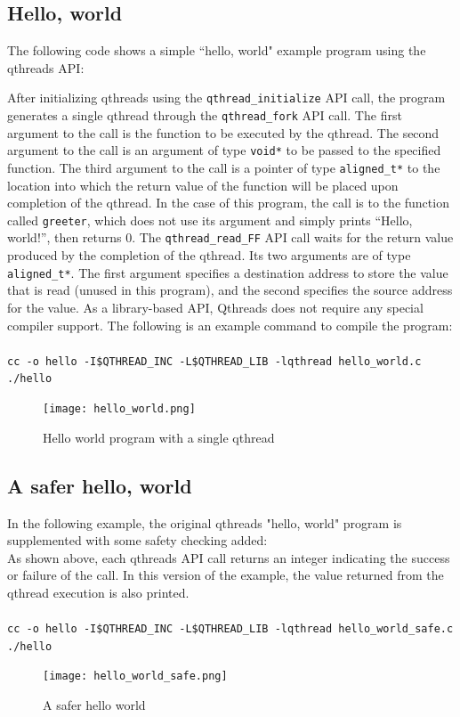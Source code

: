 \documentclass[12pt,fullpage]{article}
\begin{document}
\subsection{Hello, world}

The following code shows a simple ``hello, world" example program using the qthreads API:


After initializing qthreads using the {\tt qthread\_initialize} API call, the program generates a single qthread through the {\tt qthread\_fork} API call.  The first argument to the call is the function to be executed by the qthread.  The second argument to the call is an argument of type {\tt void*} to be passed to the specified function.  The third argument to the call is a pointer of type {\tt aligned\_t*} to the location into which the return value of the function will be placed upon completion of the qthread.  In the case of this program, the call is to the function called {\tt greeter}, which does not use its argument and simply prints ``Hello, world!'', then returns 0.  The {\tt qthread\_read\_FF} API call waits for the return value produced by the completion of the qthread.  Its two arguments are of type {\tt aligned\_t*}.  The first argument specifies a destination address to store the value that is read (unused in this program), and the second specifies the source address for the value.
As a library-based API, Qthreads does not require any special compiler support.  The following is an example command to compile the program:
\\ \\
{\footnotesize{\tt cc -o hello -I\$QTHREAD\_INC -L\$QTHREAD\_LIB -lqthread hello\_world.c}}
\\
{\footnotesize{\tt ./hello}}
\begin{figure}[h]
\texttt{[image: hello\_world.png]}
\caption{Hello world program with a single qthread}
\label{fig:hello_world}
\end{figure}

\subsection{A safer hello, world}

In the following example, the original qthreads "hello, world" program is supplemented with some safety checking added:
\\


As shown above, each qthreads API call returns an integer indicating the success or failure of the call. In this version of the example, the value returned from the qthread execution is also printed.
\\ \\
{\footnotesize{\tt cc -o hello -I\$QTHREAD\_INC -L\$QTHREAD\_LIB -lqthread hello\_world\_safe.c}}
\\
{\footnotesize{\tt ./hello}}
\begin{figure}[h]
\texttt{[image: hello\_world\_safe.png]}
\caption{A safer hello world}
\label{fig:hello_world_safe}
\end{figure}
\end{document}

